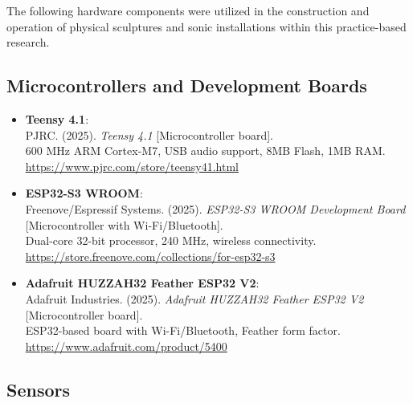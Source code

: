 
The following hardware components were utilized in the construction and operation of physical sculptures and sonic installations within this practice-based research.

\subsection*{Microcontrollers and Development Boards}

\begin{itemize}[topsep=0pt, partopsep=0pt, parsep=0pt, itemsep=6pt]
	\item \textbf{Teensy 4.1}: \\ 
	PJRC. (2025). \textit{Teensy 4.1} [Microcontroller board].\\ 
	600 MHz ARM Cortex-M7, USB audio support, 8MB Flash, 1MB RAM.\\
	\url{https://www.pjrc.com/store/teensy41.html}
	
	\item \textbf{ESP32-S3 WROOM}: \\ 
	Freenove/Espressif Systems. (2025). \textit{ESP32-S3 WROOM Development Board} [Microcontroller with Wi-Fi/Bluetooth].\\ 
	Dual-core 32-bit processor, 240 MHz, wireless connectivity.\\
	\url{https://store.freenove.com/collections/for-esp32-s3}
	
	\item \textbf{Adafruit HUZZAH32 Feather ESP32 V2}: \\ 
	Adafruit Industries. (2025). \textit{Adafruit HUZZAH32 Feather ESP32 V2} [Microcontroller board].\\ 
	ESP32-based board with Wi-Fi/Bluetooth, Feather form factor.\\
	\url{https://www.adafruit.com/product/5400}
\end{itemize}

\subsection*{Sensors}

